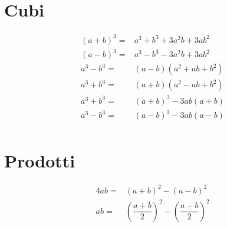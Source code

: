 \section{Cubi}
\begin{align*}
(a+b)^3=&a^3+b^3+3a^2b+3ab^2\\
(a-b)^3=&a^3-b^3-3a^2b+3ab^2\\
a^3-b^3=&(a-b)(a^2+ab+b^2)\\
a^3+b^3=&(a+b)(a^2-ab+b^2)\\
a^3+b^3=&(a+b)^3-3ab(a+b)\\
a^3-b^3=&(a-b)^3-3ab(a-b)\\
\end{align*}
\section{Prodotti}
\begin{align*}
4ab=&(a+b)^2-(a-b)^2\\
ab=&\left(\dfrac{a+b}{2}\right)^2-\left(\dfrac{a-b}{2}\right)^2\\
\end{align*}
